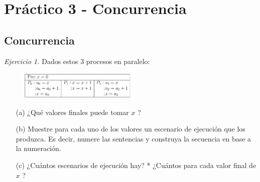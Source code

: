 \documentclass[12pt]{article}
\begin{document}
\section*{Práctico 3 - Concurrencia}
\subsection*{Concurrencia}
\noindent \textit{Ejercicio 1.} Dados estos 3 procesos en paralelo:
\begin{figure}[h]
    \centering
    \includegraphics[width=0.5\textwidth]{c1.png}
\end{figure}
\begin{itemize}
    \item[(a)] ¿Qué valores finales puede tomar $x$ ?
    \item[(b)] Muestre para cada uno de los valores un escenario de ejecución que los produzca. Es decir, numere las sentencias y construya la secuencia en base a la numeración.
    \item[(c)] ¿Cuántos escenarios de ejecución hay? * ¿Cuántos para cada valor final de $x$ ?
\end{itemize}
\end{document}
